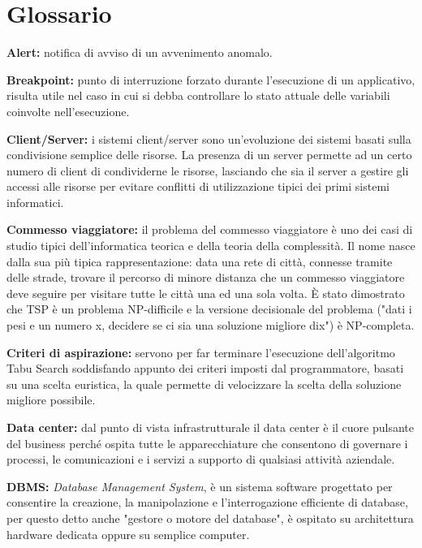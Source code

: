 \chapter{Glossario}

\begin{description}
    \item \label{Alert} \textbf{Alert:} notifica di avviso di un avvenimento anomalo.
    \item \label{Breakpoint} \textbf{Breakpoint:} punto di interruzione forzato durante l'esecuzione di un applicativo, risulta utile nel caso in cui si debba controllare lo stato attuale delle
     variabili coinvolte nell'esecuzione.
    \item \label{Client/Server} \textbf{Client/Server:} i sistemi client/server sono un'evoluzione dei sistemi basati sulla condivisione semplice delle risorse. La presenza di un server permette ad un
     certo numero di client di condividerne le risorse, lasciando che sia il server a gestire gli accessi alle risorse per evitare conflitti di utilizzazione tipici dei primi sistemi informatici.
    \item \label{Commesso viaggiatore} \textbf{Commesso viaggiatore:} il problema del commesso viaggiatore è uno
    dei casi di studio tipici dell’informatica teorica e della teoria della complessità. Il
    nome nasce dalla sua più tipica rappresentazione: data una rete di città, connesse
    tramite delle strade, trovare il percorso di minore distanza che un commesso
    viaggiatore deve seguire per visitare tutte le città una ed una sola volta. È
    stato dimostrato che TSP è un problema NP-difficile e la versione decisionale del
    problema ("dati i pesi e un numero x, decidere se ci sia una soluzione migliore dix") è NP-completa.
    \item \label{Criteri di aspirazione} \textbf{Criteri di aspirazione:} servono per far terminare l'esecuzione dell'algoritmo Tabu Search soddisfando appunto dei criteri imposti dal programmatore, basati su una scelta
    euristica, la quale permette di velocizzare la scelta della soluzione migliore possibile.
    \item \label{Data center} \textbf{Data center:} dal punto di vista infrastrutturale il data center è il cuore pulsante del business perché ospita tutte le apparecchiature che consentono di governare i processi, le comunicazioni e i servizi a supporto di qualsiasi attività aziendale.
    \item \label{DBMS} \textbf{DBMS:} \textit{Database Management System}, è un sistema software progettato per consentire la creazione, la manipolazione e l'interrogazione efficiente di database, per questo detto anche "gestore o motore del database", è ospitato su architettura hardware dedicata oppure su semplice computer.

\end{description}
